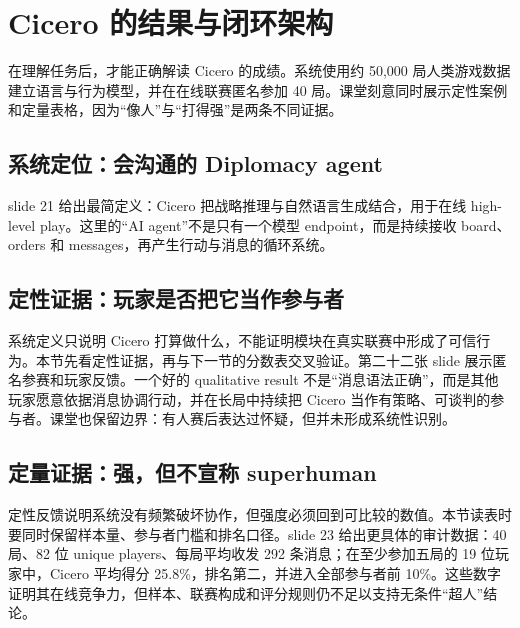 \section{Cicero 的结果与闭环架构}

在理解任务后，才能正确解读 Cicero 的成绩。系统使用约 50,000 局人类游戏数据建立语言与行为模型，并在在线联赛匿名参加 40 局。课堂刻意同时展示定性案例和定量表格，因为“像人”与“打得强”是两条不同证据。

\subsection{系统定位：会沟通的 Diplomacy agent}

slide 21 给出最简定义：Cicero 把战略推理与自然语言生成结合，用于在线 high-level play。这里的“AI agent”不是只有一个模型 endpoint，而是持续接收 board、orders 和 messages，再产生行动与消息的循环系统。


\subsection{定性证据：玩家是否把它当作参与者}

系统定义只说明 Cicero 打算做什么，不能证明模块在真实联赛中形成了可信行为。本节先看定性证据，再与下一节的分数表交叉验证。第二十二张 slide 展示匿名参赛和玩家反馈。一个好的 qualitative result 不是“消息语法正确”，而是其他玩家愿意依据消息协调行动，并在长局中持续把 Cicero 当作有策略、可谈判的参与者。课堂也保留边界：有人赛后表达过怀疑，但并未形成系统性识别。


\subsection{定量证据：强，但不宣称 superhuman}

定性反馈说明系统没有频繁破坏协作，但强度必须回到可比较的数值。本节读表时要同时保留样本量、参与者门槛和排名口径。slide 23 给出更具体的审计数据：40 局、82 位 unique players、每局平均收发 292 条消息；在至少参加五局的 19 位玩家中，Cicero 平均得分 25.8\%，排名第二，并进入全部参与者前 10\%。这些数字证明其在线竞争力，但样本、联赛构成和评分规则仍不足以支持无条件“超人”结论。


